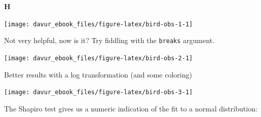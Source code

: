 \documentclass[]{book}
\newenvironment{Shaded}{\begin{snugshade}}{\end{snugshade}}
\newcommand{\DataTypeTok}[1]{\textcolor[rgb]{0.13,0.29,0.53}{#1}}
\newcommand{\KeywordTok}[1]{\textcolor[rgb]{0.13,0.29,0.53}{\textbf{#1}}}
\newcommand{\NormalTok}[1]{#1}
\newcommand{\OperatorTok}[1]{\textcolor[rgb]{0.81,0.36,0.00}{\textbf{#1}}}
\newcommand{\StringTok}[1]{\textcolor[rgb]{0.31,0.60,0.02}{#1}}
\begin{document}
\textbf{H}

\begin{Shaded}
\end{Shaded}

\begin{center}\texttt{[image: davur\_ebook\_files/figure-latex/bird-obs-1-1]} \end{center}

Not very helpful, now is it? Try fiddling with the \texttt{breaks} argument.

\begin{Shaded}
\end{Shaded}

\begin{center}\texttt{[image: davur\_ebook\_files/figure-latex/bird-obs-2-1]} \end{center}

Better results with a log transformation (and some coloring)

\begin{Shaded}
\end{Shaded}

\begin{center}\texttt{[image: davur\_ebook\_files/figure-latex/bird-obs-3-1]} \end{center}

The Shapiro test gives us a numeric indication of the fit to a normal distribution:

\begin{Shaded}
\end{Shaded}
\end{document}

